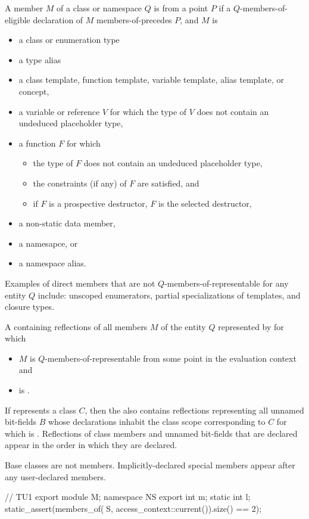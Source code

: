 \begin{itemdescr}
\pnum
A member $M$ of a class or namespace $Q$ is
 from a point $P$
if a $Q$-members-of-eligible declaration of $M$ members-of-precedes $P$,
and $M$ is
\begin{itemize}
\item
  a class or enumeration type
\item
  a type alias
\item
  a class template, function template,
  variable template, alias template, or concept,
\item
  a variable or reference $V$
  for which the type of $V$ does not contain an undeduced placeholder type,
\item
  a function $F$ for which
  \begin{itemize}
  \item
    the type of $F$  does not contain an undeduced placeholder type,
  \item
    the constraints (if any) of $F$ are satisfied, and
  \item
    if $F$ is a prospective destructor,
    $F$ is the selected destructor,
  \end{itemize}
\item
  a non-static data member,
\item
  a namesapce, or
\item
  a namespace alias.
\end{itemize}
\begin{note}
Examples of direct members that are not $Q$-members-of-representable
for any entity $Q$ include:
unscoped enumerators,
partial specializations of templates, and
closure types.
\end{note}

\pnum
\returns
A  containing reflections of all members $M$
of the entity $Q$ represented by  for which
\begin{itemize}
\item
  $M$ is $Q$-members-of-representable
  from some point in the evaluation context and
\item
   is .
\end{itemize}
If  represents a class $C$,
then the  also contains reflections
representing all unnamed bit-fields $B$
whose declarations inhabit the class scope corresponding to $C$
for which  is .
Reflections of class members and unnamed bit-fields that are declared
appear in the order in which they are declared.
\begin{note}
Base classes are not members.
Implicitly-declared special members
appear after any user-declared members.
\end{note}
\begin{example}
\begin{codeblock}
// TU1
export module M;
namespace NS {
  export int m;
  static int l;
}
static_assert(members_of(^^NS, access_context::current()).size() == 2);


\end{codeblock}
\end{example}
\end{itemdescr}
